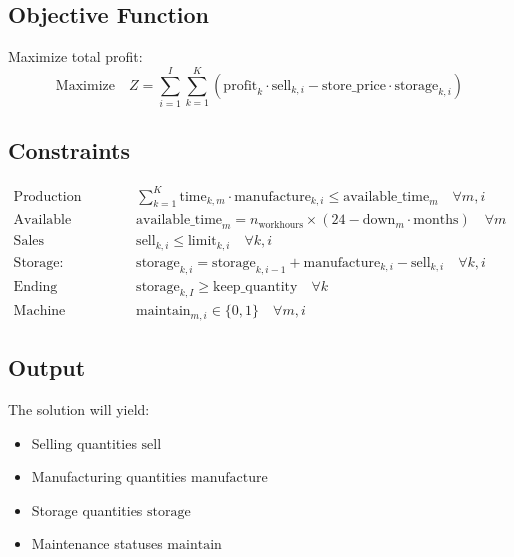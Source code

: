 \documentclass{article}
\begin{document}
\subsection*{Objective Function}
Maximize total profit:
\[
\text{Maximize} \quad Z = \sum_{i=1}^{I} \sum_{k=1}^{K} \left( \text{profit}_k \cdot \text{sell}_{k,i} - \text{store\_price} \cdot \text{storage}_{k,i} \right)
\]

\subsection*{Constraints}
\begin{align}
    \text{Production Time Constraint:} & \quad \sum_{k=1}^{K} \text{time}_{k, m} \cdot \text{manufacture}_{k,i} \leq \text{available\_time}_m \quad \forall m, i \\
    \text{Available Time:} & \quad \text{available\_time}_m = n_{\text{workhours}} \times \left(24 - \text{down}_m \cdot \text{months}\right) \quad \forall m \\
    \text{Sales Limitations:} & \quad \text{sell}_{k,i} \leq \text{limit}_{k,i} \quad \forall k, i \\
    \text{Storage:} & \quad \text{storage}_{k,i} = \text{storage}_{k,i-1} + \text{manufacture}_{k,i} - \text{sell}_{k,i} \quad \forall k, i \\
    \text{Ending Inventory Requirement:} & \quad \text{storage}_{k,I} \geq \text{keep\_quantity} \quad \forall k \\
    \text{Machine Maintenance:} & \quad \text{maintain}_{m,i} \in \{0,1\} \quad \forall m, i
\end{align}

\subsection*{Output}
The solution will yield:
\begin{itemize}
    \item Selling quantities \( \text{sell} \)
    \item Manufacturing quantities \( \text{manufacture} \)
    \item Storage quantities \( \text{storage} \)
    \item Maintenance statuses \( \text{maintain} \)
\end{itemize}
\end{document}
